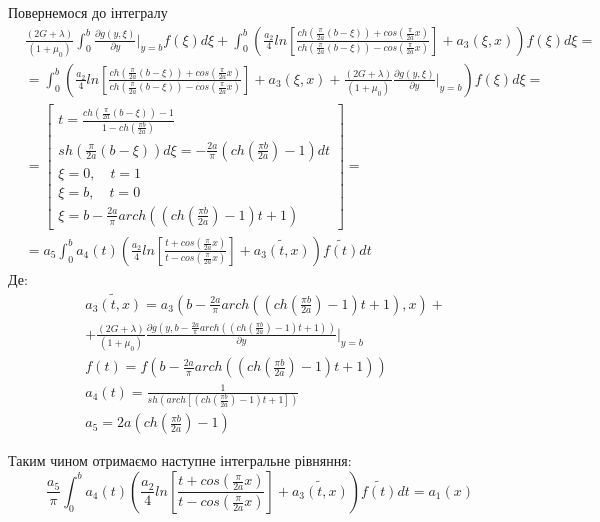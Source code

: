 Повернемося до інтегралу
\begin{align}
    &\frac{(2G + \lambda)}{(1+\mu_0)} \int_{0}^{b}\frac{\partial g(y, \xi)}{\partial y}|_{y=b} f(\xi) d\xi + \int_{0}^{b} \left( \frac{a_2}{4} ln\left[ \frac{ch(\frac{\pi}{2a}(b - \xi)) + cos(\frac{\pi}{2a}x)}{ch(\frac{\pi}{2a}(b - \xi)) - cos(\frac{\pi}{2a}x)} \right] + a_3(\xi, x) \right) f(\xi) d\xi = \\
    & = \int_{0}^{b} \left( \frac{a_2}{4} ln\left[ \frac{ch(\frac{\pi}{2a}(b - \xi)) + cos(\frac{\pi}{2a}x)}{ch(\frac{\pi}{2a}(b - \xi)) - cos(\frac{\pi}{2a}x)} \right] + a_3(\xi, x) + \frac{(2G + \lambda)}{(1+\mu_0)} \frac{\partial g(y, \xi)}{\partial y}|_{y=b} \right) f(\xi) d\xi = \\
    &= \left[
        \begin{matrix}
            t = \frac{ch(\frac{\pi}{2a}(b - \xi)) - 1}{1 - ch(\frac{\pi b}{2a})} \\
            sh(\frac{\pi}{2a}(b - \xi))d\xi = -\frac{2a}{\pi} (ch(\frac{\pi b}{2a}) - 1) dt \\
            \xi = 0, \quad t = 1 \\
            \xi = b, \quad t = 0 \\
            \xi = b - \frac{2a}{\pi} arch((ch(\frac{\pi b}{2a}) - 1)t + 1)
        \end{matrix}
        \right] = \\
    &=a_5 \int_{0}^{b} a_4(t) \left( \frac{a_2}{4} ln\left[ \frac{t + cos(\frac{\pi}{2a}x)}{t - cos(\frac{\pi}{2a}x)} \right] + \widetilde{a_3(t, x)} \right) \widetilde{f(t)} dt
\end{align}
Де:
\begin{align*}
    &\widetilde{a_3(t, x)} = a_3\left(b - \frac{2a}{\pi} arch((ch(\frac{\pi b}{2a}) - 1)t + 1), x \right) + \\
    &+ \frac{(2G + \lambda)}{(1+\mu_0)} \frac{\partial g(y, b - \frac{2a}{\pi} arch((ch(\frac{\pi b}{2a}) - 1)t + 1))}{\partial y}|_{y=b} \\
    &f(t) = f(b - \frac{2a}{\pi} arch((ch(\frac{\pi b}{2a}) - 1)t + 1)) \\
    &a_4(t) = \frac{1}{ sh\left(arch\left[ (ch(\frac{\pi b}{2a}) - 1)t + 1 \right]\right) } \\
    &a_5 = 2a (ch(\frac{\pi b}{2a}) - 1)
\end{align*}

Таким чином отримаємо наступне інтегральне рівняння:
\begin{equation}
    \frac{a_5}{\pi} \int_{0}^{b} a_4(t) \left( \frac{a_2}{4} ln\left[ \frac{t + cos(\frac{\pi}{2a}x)}{t - cos(\frac{\pi}{2a}x)} \right] + \widetilde{a_3(t, x)} \right) \widetilde{f(t)} dt = a_1(x)
\end{equation}

